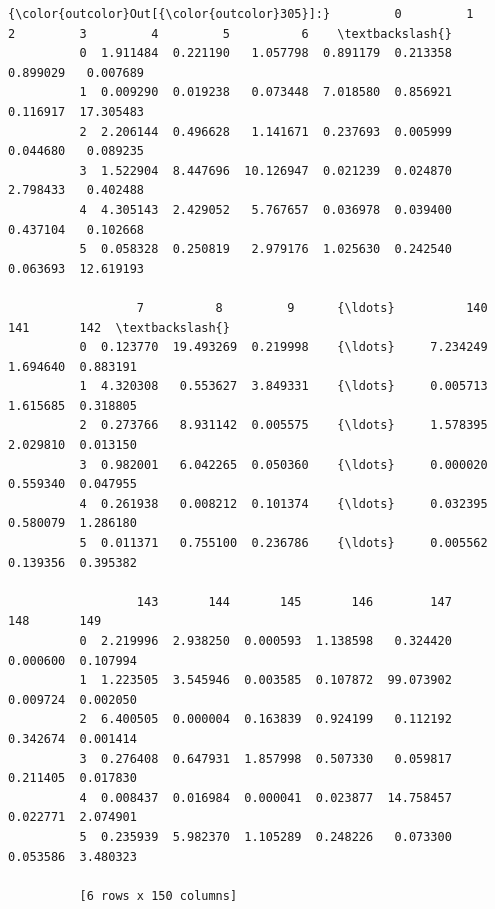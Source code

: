 \documentclass[11pt]{article}
\begin{document}
\begin{Verbatim}[commandchars=\\\{\}]
{\color{outcolor}Out[{\color{outcolor}305}]:}         0         1          2         3         4         5          6    \textbackslash{}
          0  1.911484  0.221190   1.057798  0.891179  0.213358  0.899029   0.007689   
          1  0.009290  0.019238   0.073448  7.018580  0.856921  0.116917  17.305483   
          2  2.206144  0.496628   1.141671  0.237693  0.005999  0.044680   0.089235   
          3  1.522904  8.447696  10.126947  0.021239  0.024870  2.798433   0.402488   
          4  4.305143  2.429052   5.767657  0.036978  0.039400  0.437104   0.102668   
          5  0.058328  0.250819   2.979176  1.025630  0.242540  0.063693  12.619193   
          
                  7          8         9      {\ldots}          140       141       142  \textbackslash{}
          0  0.123770  19.493269  0.219998    {\ldots}     7.234249  1.694640  0.883191   
          1  4.320308   0.553627  3.849331    {\ldots}     0.005713  1.615685  0.318805   
          2  0.273766   8.931142  0.005575    {\ldots}     1.578395  2.029810  0.013150   
          3  0.982001   6.042265  0.050360    {\ldots}     0.000020  0.559340  0.047955   
          4  0.261938   0.008212  0.101374    {\ldots}     0.032395  0.580079  1.286180   
          5  0.011371   0.755100  0.236786    {\ldots}     0.005562  0.139356  0.395382   
          
                  143       144       145       146        147       148       149  
          0  2.219996  2.938250  0.000593  1.138598   0.324420  0.000600  0.107994  
          1  1.223505  3.545946  0.003585  0.107872  99.073902  0.009724  0.002050  
          2  6.400505  0.000004  0.163839  0.924199   0.112192  0.342674  0.001414  
          3  0.276408  0.647931  1.857998  0.507330   0.059817  0.211405  0.017830  
          4  0.008437  0.016984  0.000041  0.023877  14.758457  0.022771  2.074901  
          5  0.235939  5.982370  1.105289  0.248226   0.073300  0.053586  3.480323  
          
          [6 rows x 150 columns]
\end{Verbatim}
            
\end{document}
